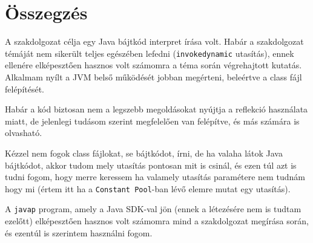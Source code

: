\chapter{Összegzés}
\label{ch:sum}

A szakdolgozat célja egy Java bájtkód interpret írása volt. Habár a szakdolgozat témáját nem sikerült teljes egészében lefedni (\lstinline{invokedynamic} utasítás), ennek ellenére elképesztően hasznos volt számomra a téma során végrehajtott kutatás. Alkalmam nyílt a JVM belső működését jobban megérteni, beleértve a class fájl felépítését.

Habár a kód biztosan nem a legszebb megoldásokat nyújtja a reflekció használata miatt, de jelenlegi tudásom szerint megfelelően van felépítve, és más számára is olvasható.

Kézzel nem fogok class fájlokat, se bájtkódot, írni, de ha valaha látok Java bájtkódot, akkor tudom mely utasítás pontosan mit is csinál, és ezen túl azt is tudni fogom, hogy merre keressem ha valamely utasítás paramétere nem tudnám hogy mi (értem itt ha a \lstinline{Constant Pool}-ban lévő elemre mutat egy utasítás).

A \lstinline{javap} program, amely a Java SDK-val jön (ennek a létezésére nem is tudtam ezelőtt) elképesztően hasznos volt számomra mind a szakdolgozat megírása során, és ezentúl is szerintem használni fogom.